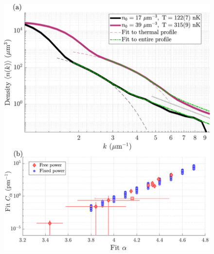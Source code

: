   \begin{figure}[p]%
    \begin{fullpage}
       \includegraphics[width=\textwidth]{fig/depletion/fit_issues}
    \end{fullpage}
  \end{figure}

	\begin{figure}
	        
	\end{figure}

	


